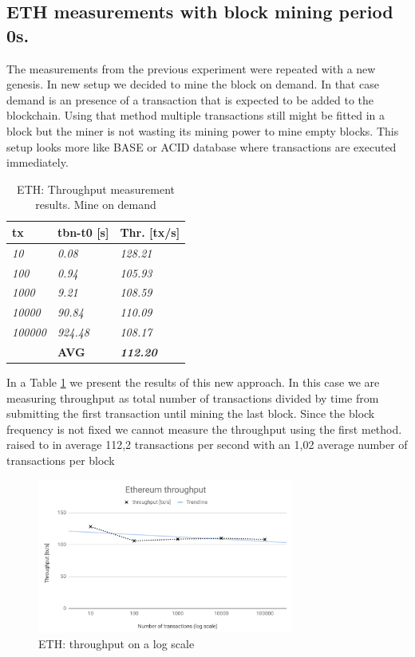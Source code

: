 \subsection{ETH measurements with block mining period 0s.}

The measurements from the previous experiment were repeated with a new genesis. In new setup we decided to mine the block on demand. In that case demand is an presence of a transaction that is expected to be added to the blockchain. Using that method multiple transactions still might be fitted in a block but the miner is not wasting its mining power to mine empty blocks. This setup looks more like BASE or ACID database where transactions are executed immediately. 

\begin{table}[!h]
\centering
\begin{tabular}{l|l|l|}
\hline
\multicolumn{1}{|l|}{\textbf{tx}} & \textbf{tbn-t0 {[}s{]}} & \textbf{Thr. {[}tx/s{]}} \\ \hline
\multicolumn{1}{|l|}{\textit{10}} & \textit{0.08} & \textit{128.21} \\ \hline
\multicolumn{1}{|l|}{\textit{100}} & \textit{0.94} & \textit{105.93} \\ \hline
\multicolumn{1}{|l|}{\textit{1000}} & \textit{9.21} & \textit{108.59} \\ \hline
\multicolumn{1}{|l|}{\textit{10000}} & \textit{90.84} & \textit{110.09} \\ \hline
\multicolumn{1}{|l|}{\textit{100000}} & \textit{924.48} & \textit{108.17} \\ \hline
 & \textbf{AVG} & \textit{\textbf{112.20}} \\ \cline{2-3} 
\end{tabular}
\caption{ETH: Throughput measurement results. Mine on demand}
\label{table:3}
\end{table}

In a Table \ref{table:3} we present the results of this new approach. In this case we are measuring throughput as total number of transactions divided by time from submitting the first transaction until mining the last block. Since the block frequency is not fixed we cannot measure the throughput using the first method.   raised to in average 112,2 transactions per second with an 1,02 average number of transactions per block 

\begin{figure}[!h]
    \centering
    \includegraphics[width=0.75\textwidth]{img/Throughput0s.png}
   \caption{ETH: throughput on a log scale}
   \label{fig:tx0s}
\end{figure}

